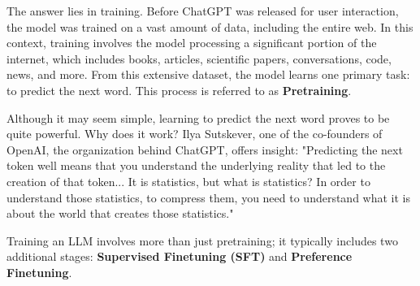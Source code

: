 The answer lies in training. Before ChatGPT was released for user interaction, the model was trained on a vast amount of data, including the entire web. In this context, training involves the model processing a significant portion of the internet, which includes books, articles, scientific papers, conversations, code, news, and more. From this extensive dataset, the model learns one primary task: to predict the next word. This process is referred to as \textbf{Pretraining}.

Although it may seem simple, learning to predict the next word proves to be quite powerful. Why does it work?  Ilya Sutskever, one of the co-founders of OpenAI, the organization behind ChatGPT, offers insight: "Predicting the next token well means that you understand the underlying reality that led to the creation of that token... It is statistics, but what is statistics? In order to understand those statistics, to compress them, you need to understand what it is about the world that creates those statistics."


Training an LLM involves more than just pretraining; it typically includes two additional stages: \textbf{Supervised Finetuning (SFT)} and \textbf{Preference Finetuning}.









